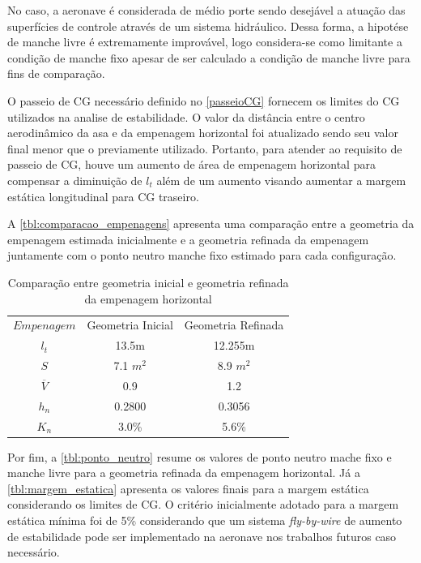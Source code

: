 No caso, a aeronave é considerada de médio porte sendo desejável a atuação das superfícies de controle através de um sistema hidráulico. Dessa forma, a hipotése de manche livre é extremamente improvável, logo considera-se como limitante a condição de manche fixo apesar de ser calculado a condição de manche livre para fins de comparação.

O passeio de CG necessário definido no \autoref{passeioCG} fornecem os limites do CG utilizados na analise de estabilidade. O valor da distância entre o centro aerodinâmico da asa e da empenagem horizontal foi atualizado sendo seu valor final menor que o previamente utilizado. Portanto, para atender ao requisito de passeio de CG, houve um aumento de área de empenagem horizontal para compensar a diminuição de $l_t$ além de um aumento visando aumentar a margem estática longitudinal para CG traseiro.

A \autoref{tbl:comparacao_empenagens} apresenta uma comparação entre a geometria da empenagem estimada inicialmente e a geometria refinada da empenagem juntamente com o ponto neutro manche fixo estimado para cada configuração.

\begin{table}[H]
\centering
\begin{tabular}{ccc}
\toprule
$ Empenagem $ & Geometria Inicial & Geometria Refinada \\
$ l_t $ & 13.5m & 12.255m \\
$ S $ & 7.1 $m^2$ & 8.9 $m^2$ \\
$ \overline{V} $ & 0.9 & 1.2 \\
$ h_n $ & 0.2800 & 0.3056 \\
$ K_n $ & 3.0\% & 5.6\% \\
\bottomrule
\end{tabular}
\caption[Comparação entre geometria inicial e geometria refinada da empenagem horizontal]{Comparação entre geometria inicial e geometria refinada da empenagem horizontal}
\label{tbl:comparacao_empenagens}
\end{table}

Por fim, a \autoref{tbl:ponto_neutro} resume os valores de ponto neutro mache fixo e manche livre para a geometria refinada da empenagem horizontal. Já a \autoref{tbl:margem_estatica} apresenta os valores finais para a margem estática considerando os limites de CG. O critério inicialmente adotado para a margem estática mínima foi de 5\% considerando que um sistema \textit{fly-by-wire} de aumento de estabilidade pode ser implementado na aeronave nos trabalhos futuros caso necessário.

